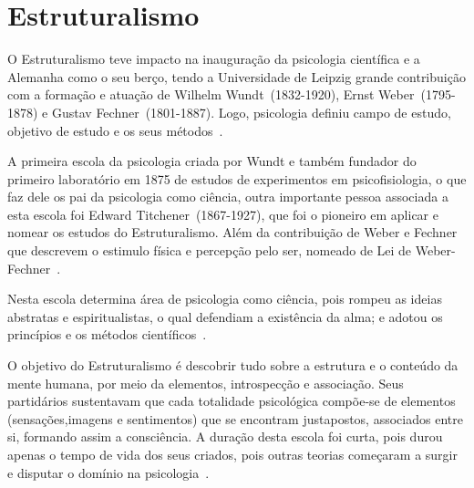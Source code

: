 \section{Estruturalismo}\label{estruturalismo}

O Estruturalismo teve impacto na inauguração da psicologia científica e a Alemanha como o seu berço, tendo a Universidade de Leipzig grande contribuição com a formação e atuação de Wilhelm Wundt~(1832-1920), Ernst Weber~(1795-1878) e Gustav Fechner~(1801-1887).
Logo, psicologia definiu campo de estudo, objetivo de estudo e os seus métodos~\cite{hothersall1997historia,bock1999psicologias}. 

A primeira escola da psicologia criada por Wundt e também fundador do primeiro laboratório em 1875 de estudos de experimentos em psicofisiologia, o que faz dele os pai da psicologia como ciência, outra importante pessoa associada a esta escola foi Edward Titchener~(1867-1927), que foi o pioneiro em aplicar e nomear os estudos do Estruturalismo.
Além da contribuição de Weber e Fechner que descrevem o estimulo física e percepção pelo ser, nomeado de Lei de Weber-Fechner~\cite{hothersall1997historia,bock1999psicologias}. 

Nesta escola determina área de psicologia como ciência, pois rompeu as ideias abstratas e espiritualistas, o qual defendiam a existência da alma; e adotou os princípios e os métodos científicos~\cite{bock1999psicologias,freitas2008historia}. 

O objetivo do Estruturalismo é descobrir tudo sobre a estrutura e o conteúdo da mente humana, por meio da elementos, introspecção e associação.
Seus partidários sustentavam que cada totalidade psicológica compõe-se de elementos (sensações,imagens e sentimentos) que se encontram justapostos, associados entre si, formando assim a consciência.
A duração desta escola foi curta, pois durou apenas o tempo de vida dos seus criados, pois outras teorias começaram a surgir e disputar o domínio na psicologia~\cite{silva2007psicologia_educacao}.  
